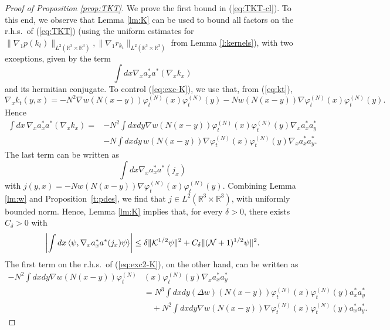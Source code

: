 \documentclass[11pt,a4paper]{article}
\newcommand{\bR}{{\mathbb R}}
\newcommand{\cK}{{\cal K}}
\newcommand{\cN}{{\cal N}}
\begin{document}
\begin{proof}[Proof of Proposition \ref{prop:TKT}] 
We prove the first bound in (\ref{eq:TKT-cl}). To this end, we observe that Lemma \ref{lm:K} can be used to bound all factors on the r.h.s.\ of (\ref{eq:TKT})  (using the uniform estimates for $\| \nabla_1 p (k_t) \|_{L^2 (\bR^3 \times \bR^3)}, \| \nabla_1 r_{k_t} \|_{L^2 (\bR^3 \times \bR^3)}$ from Lemma \ref{l:kernels}), with two exceptions, given by the term
\begin{equation}\label{eq:exc-K} \int dx \nabla_x a^*_x a^* (\nabla_x k_x) \end{equation}
and its hermitian conjugate. To control (\ref{eq:exc-K}), we use that, from (\ref{eq:kt}),
\[ \nabla_x k_t (y,x) = - N^2 \nabla w (N (x-y)) \varphi_t^{(N)} (x) \varphi_t^{(N)} (y) - N w (N (x-y)) \nabla\varphi_t^{(N)} (x) \varphi_t^{(N)} (y).  \]
Hence
\begin{equation}\label{eq:exc2-K} \begin{split} 
\int dx \, \nabla_x a_x^* a^* (\nabla_x k_x)  = &- N^2 \int dx dy \nabla w (N (x-y)) \varphi_t^{(N)} (x) \varphi_t^{(N)} (y) \nabla_x a^*_x a_y^* \\ &- N \int dx dy \, w(N (x-y)) \nabla \varphi_t^{(N)} (x) \varphi_t^{(N)} (y) \nabla_x a_x^* a_y^*.   \end{split}\end{equation}
The last term can be written as
\begin{equation} \int dx  \nabla_x a_x^* a^* (j_x) \end{equation}
with $j(y,x) = -N w(N (x-y)) \nabla \varphi_t^{(N)} (x) \varphi_t^{(N)} (y)$. Combining Lemma \ref{lm:w} and Proposition~\ref{t:pdes}, we find that $j \in L^2 (\bR^3 \times \bR^3)$, with uniformly bounded norm. Hence, Lemma \ref{lm:K} implies that, for every $\delta > 0$, there exists $C_\delta >0$ with
\begin{equation}\label{eq:exc3-K} \left| \int dx \, \langle \psi , \nabla_x a_x^* a^* (j_x) \psi \rangle \right| \leq \delta \| \cK^{1/2} \psi \|^2 + C_\delta \| (\cN + 1)^{1/2} \psi \|^2. \end{equation}
The first term on the r.h.s.\ of (\ref{eq:exc2-K}), on the other hand, can be written as
\[ \begin{split}
- N^2 \int dx dy \nabla w (N (x-y)) \varphi_t^{(N)} &(x) \varphi_t^{(N)} (y) \nabla_x a^*_x a_y^* \\ &=
 N^3 \int dx dy (\Delta w) (N (x-y)) \varphi_t^{(N)} (x) \varphi_t^{(N)} (y)
 a^*_x a_y^* \\ &\quad + N^2 \int dx dy \nabla w (N (x-y)) \nabla \varphi^{(N)}_t (x) \varphi_t^{(N)} (y) a_x^* a_y^*. \end{split} \]

\end{proof}
\end{document}
